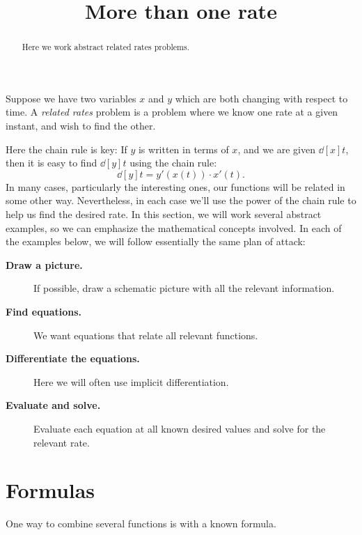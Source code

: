 \documentclass{ximera}
\title[Dig-In:]{More than one rate}
\begin{document}
\begin{abstract}
  Here we work abstract related rates problems.
\end{abstract}
\maketitle


Suppose we have two variables $x$ and $y$ which are both changing with
respect to time.  A \textit{related rates} problem is a problem where
we know one rate at a given instant, and wish to find the other.

Here the chain rule is key: If $y$ is written in terms of $x$, and we
are given $\dd[x]{t}$, then it is easy to find $\dd[y]{t}$ using the
chain rule:
\[
\dd[y]{t}=y'(x(t))\cdot x'(t).
\]
In many cases, particularly the interesting ones, our functions will
be related in some other way. Nevertheless, in each case we'll use the
power of the chain rule to help us find the desired rate. In this
section, we will work several abstract examples, so we can emphasize
the mathematical concepts involved. In each of the examples below, we
will follow essentially the same plan of attack:

\begin{description}
\item[\textbf{Draw a picture.}] If possible, draw a schematic picture
  with all the relevant information.
\item[\textbf{Find equations.}] We want equations that relate all
  relevant functions.
\item[\textbf{Differentiate the equations.}] Here we will often use
  implicit differentiation.
\item[\textbf{Evaluate and solve.}] Evaluate
  each equation at all known desired values and solve for the relevant
  rate.
\end{description}


\section{Formulas}

One way to combine several functions is with a known formula.
\end{document}
